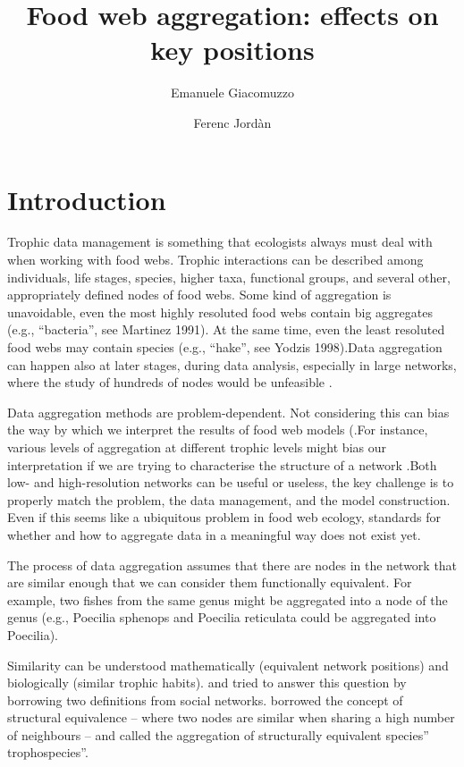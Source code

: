 \documentclass[twocolumn]{article}
\title{Food web aggregation: effects on key positions}
\author[1]{Emanuele Giacomuzzo}
\author[1,2]{Ferenc Jordàn}
\affil[1]{Centre for Ecological Research, Budapest, Karolina 26, 1113, Hungary}
\affil[2]{Stazione Zoologica Anton Dohrn, Napoli, 80122, Italy}
\date{}
\begin{document}
\maketitle
\section*{Introduction}
	\par
	Trophic data management is something that ecologists always must deal with when working with food webs.
	Trophic interactions can be described among individuals, life stages, species, higher taxa, functional groups, and several other, appropriately defined nodes of food webs.
	Some kind of aggregation is unavoidable, even the most highly resoluted food webs contain big aggregates (e.g., “bacteria'', see Martinez 1991).
	At the same time, even the least resoluted food webs may contain species (e.g., “hake”, see Yodzis 1998).Data aggregation can happen also at later stages, during data analysis, especially in large networks, where the study of hundreds of nodes would be unfeasible \citep{Yodzis1999}.
	\par
	Data aggregation methods are problem-dependent. Not considering this can bias the way by which we interpret the results of food web models (\citep{Paine1988, Hall1993}.For instance, various levels of aggregation at different trophic levels might bias our interpretation if we are trying to characterise the structure of a network \citep{Yodzis1999}.Both low- and high-resolution networks can be useful or useless, the key challenge is to properly match the problem, the data management, and the model construction.
	Even if this seems like a ubiquitous problem in food web ecology, standards for whether and how to aggregate data in a meaningful way does not exist yet.
	\par
	The process of data aggregation assumes that there are nodes in the network that are similar enough that we can consider them functionally equivalent.
	For example, two fishes from the same genus might be aggregated into a node of the genus (e.g., Poecilia sphenops and Poecilia reticulata could be aggregated into Poecilia).
	\par
	Similarity can be understood mathematically (equivalent network positions) and biologically (similar trophic habits).
	\citet{Yodzis1999} and \citet{Luczkovich2003} tried to answer this question by borrowing two definitions from social networks. \citet{Yodzis1999} borrowed the concept of structural equivalence – where two nodes are similar when sharing a high number of neighbours – and called the aggregation of structurally equivalent species” trophospecies”.
\end{document}
